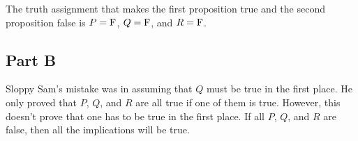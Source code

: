 \documentclass{article}
\begin{document}
The truth assignment that makes the first proposition true and the second
proposition false is $P = \rm{F}$, $Q = \rm{F}$, and $R = \rm{F}$.

\subsection*{Part B}

Sloppy Sam's mistake was in assuming that $Q$ must be true in the first place.
He only proved that $P$, $Q$, and $R$ are all true if one of them is true.
However, this doesn't prove that one has to be true in the first place. If all
$P$, $Q$, and $R$ are false, then all the implications will be true.
\end{document}
